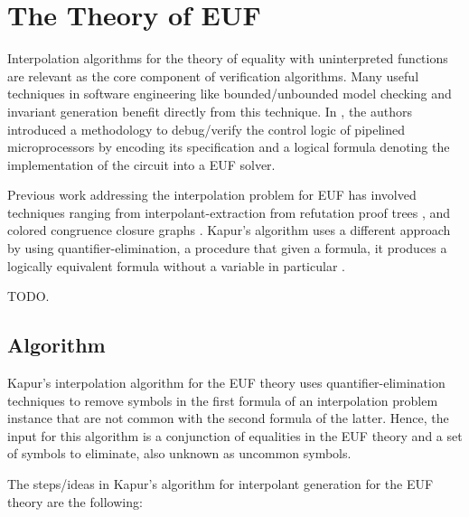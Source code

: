 \chapter{The Theory of EUF}

Interpolation algorithms for the theory of equality with uninterpreted functions are relevant as the core component of verification algorithms. Many useful techniques in software engineering like bounded/unbounded model checking and invariant generation benefit directly from this technique. In \cite{10.1007/3-540-58179-0_44}, the authors introduced a methodology to debug/verify the control logic of pipelined microprocessors by encoding its specification and a logical formula denoting the implementation of the circuit into a EUF solver.

Previous work addressing the interpolation problem for EUF has involved techniques ranging from
interpolant-extraction from refutation proof trees \cite{10.1007/978-3-540-24730-2_2,
  mcmillan2011interpolants, 10.1007/978-3-642-31612-8_24}, and colored congruence closure
graphs \cite{10.1007/978-3-642-00768-2_34}. Kapur's algorithm uses a different approach by using
quantifier-elimination, a procedure that given a formula, it produces a logically equivalent formula
 without a variable in particular \cite{DBLP:books/daglib/0076838}.

 TODO.

\section{Algorithm}

Kapur's interpolation algorithm for the EUF theory uses quantifier-elimination
techniques to remove symbols in the first formula of an interpolation problem instance
that are not common with the second formula of the latter. 
Hence, the input for this algorithm is a conjunction of equalities in the
EUF theory and a set of symbols to eliminate, also unknown as uncommon symbols.

The steps/ideas in Kapur's algorithm for interpolant generation for the EUF theory
are the following:

